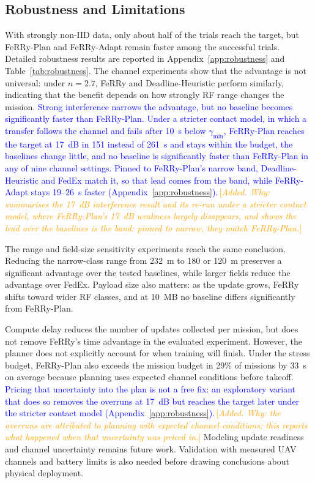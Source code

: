 \documentclass[conference]{IEEEtran}
\newcommand{\sysname}{FeRRy}
\newcommand{\changenote}[1]{\textcolor{orange}{\,[\emph{#1}]}}
\begin{document}
\subsection{Robustness and Limitations}
\label{sec:robustness}
With strongly non-IID data, only about half of the trials reach the target, but
\sysname{}-Plan and \sysname{}-Adapt remain faster among the successful trials. Detailed robustness results are reported in
Appendix~\ref{app:robustness} and Table~\ref{tab:robustness}.
The channel experiments show that the advantage is not universal: under
\(n=2.7\), \sysname{} and Deadline-Heuristic perform similarly, indicating
that the benefit depends on how strongly RF range changes the mission.
\textcolor{blue}{Strong interference narrows the advantage, but no baseline becomes
significantly faster than \sysname{}-Plan. Under a stricter contact model, in
which a transfer follows the channel and fails after 10~s below
$\gamma_{\min}$, \sysname{}-Plan reaches the target at 17~dB in 151 instead of
261~s and stays within the budget, the baselines change little, and no baseline
is significantly faster than \sysname{}-Plan in any of nine channel settings.
Pinned to \sysname{}-Plan's narrow band, Deadline-Heuristic and FedEx match it,
so that lead comes from the band, while \sysname{}-Adapt stays 19--26~s faster
(Appendix~\ref{app:robustness}).}\changenote{Added. Why: summarises the 17~dB interference result and its re-run under a stricter contact model, where \sysname{}-Plan's 17~dB weakness largely disappears, and shows the lead over the baselines is the band: pinned to narrow, they match \sysname{}-Plan.}

The range and field-size sensitivity experiments reach the same conclusion.
Reducing the narrow-class range from 232~m to 180 or 120~m preserves a
significant advantage over the tested baselines, while larger fields reduce the
advantage over FedEx. Payload size also matters: as the update grows,
\sysname{} shifts toward wider RF classes, and at 10~MB no baseline differs
significantly from \sysname{}-Plan.

Compute delay reduces the number of updates collected per mission, but does not
remove \sysname{}'s time advantage in the evaluated experiment. However, the
planner does not explicitly account for when training will finish. Under the
stress budget, \sysname{}-Plan also exceeds the mission budget in 29\% of
missions by 33~s on average because planning uses expected channel conditions
before takeoff. \textcolor{blue}{Pricing that uncertainty into the plan is not a
free fix: an exploratory variant that does so removes the overruns at 17~dB but
reaches the target later under the stricter contact model
(Appendix~\ref{app:robustness}).}\changenote{Added. Why: the overruns are attributed to planning with expected channel conditions; this reports what happened when that uncertainty was priced in.} Modeling update readiness and channel uncertainty remains
future work. Validation with measured UAV channels and battery limits is also
needed before drawing conclusions about physical deployment.
\end{document}

